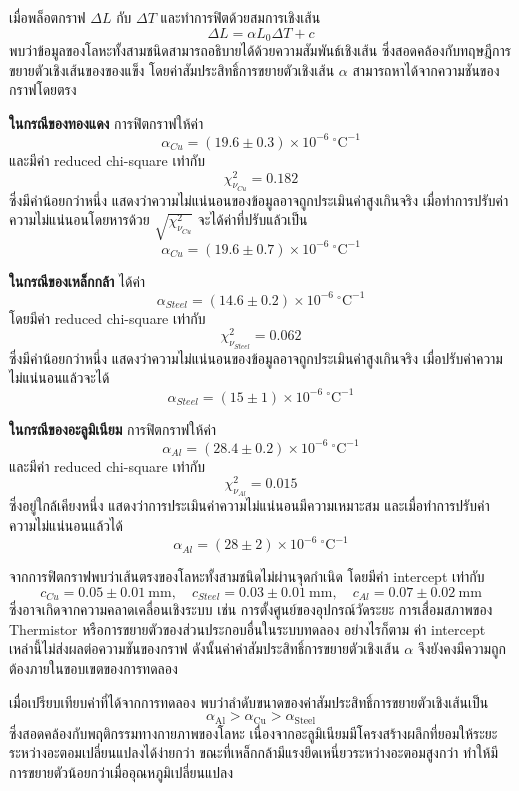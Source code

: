 \documentclass[11pt,a4paper]{article}
\begin{document}
เมื่อพล็อตกราฟ $\Delta L$ กับ $\Delta T$ และทำการฟิตด้วยสมการเชิงเส้น
\[
\Delta L = \alpha L_0 \Delta T + c
\]
พบว่าข้อมูลของโลหะทั้งสามชนิดสามารถอธิบายได้ด้วยความสัมพันธ์เชิงเส้น
ซึ่งสอดคล้องกับทฤษฎีการขยายตัวเชิงเส้นของของแข็ง
โดยค่าสัมประสิทธิ์การขยายตัวเชิงเส้น $\alpha$ สามารถหาได้จากความชันของกราฟโดยตรง
\newline
\medskip

\textbf{ในกรณีของทองแดง} การฟิตกราฟให้ค่า
\[
\alpha_{Cu} = (19.6 \pm 0.3)\times10^{-6}\ ^\circ\mathrm{C}^{-1}
\]
และมีค่า reduced chi-square เท่ากับ
\[
\chi_{\nu_{Cu}}^2 = 0.182
\]
ซึ่งมีค่าน้อยกว่าหนึ่ง แสดงว่าความไม่แน่นอนของข้อมูลอาจถูกประเมินค่าสูงเกินจริง
เมื่อทำการปรับค่าความไม่แน่นอนโดยหารด้วย $\sqrt{\chi_{\nu_{Cu}}^2}$
จะได้ค่าที่ปรับแล้วเป็น
\[
\alpha_{Cu} = (19.6 \pm 0.7)\times10^{-6}\ ^\circ\mathrm{C}^{-1}
\]

\newline
\medskip

\textbf{ในกรณีของเหล็กกล้า} ได้ค่า
\[
\alpha_{Steel} = (14.6 \pm 0.2)\times10^{-6}\ ^\circ\mathrm{C}^{-1}
\]
โดยมีค่า reduced chi-square เท่ากับ
\[
\chi_{\nu_{Steel}}^2 = 0.062
\]
ซึ่งมีค่าน้อยกว่าหนึ่ง แสดงว่าความไม่แน่นอนของข้อมูลอาจถูกประเมินค่าสูงเกินจริง
เมื่อปรับค่าความไม่แน่นอนแล้วจะได้
\[
\alpha_{Steel} = (15 \pm 1)\times10^{-6}\ ^\circ\mathrm{C}^{-1}
\]

\newline
\medskip

\textbf{ในกรณีของอะลูมิเนียม} การฟิตกราฟให้ค่า
\[
\alpha_{Al} = (28.4 \pm 0.2)\times10^{-6}\ ^\circ\mathrm{C}^{-1}
\]
และมีค่า reduced chi-square เท่ากับ
\[
\chi_{\nu_{Al}}^2 = 0.015
\]
ซึ่งอยู่ใกล้เคียงหนึ่ง แสดงว่าการประเมินค่าความไม่แน่นอนมีความเหมาะสม
และเมื่อทำการปรับค่าความไม่แน่นอนแล้วได้
\[
\alpha_{Al} = (28 \pm 2)\times10^{-6}\ ^\circ\mathrm{C}^{-1}
\]

จากการฟิตกราฟพบว่าเส้นตรงของโลหะทั้งสามชนิดไม่ผ่านจุดกำเนิด
โดยมีค่า intercept เท่ากับ
\[
c_{Cu} = 0.05 \pm 0.01\ \mathrm{mm}, \quad
c_{Steel} = 0.03 \pm 0.01\ \mathrm{mm}, \quad
c_{Al} = 0.07 \pm 0.02\ \mathrm{mm}
\]
ซึ่งอาจเกิดจากความคลาดเคลื่อนเชิงระบบ
เช่น การตั้งศูนย์ของอุปกรณ์วัดระยะ การเสื่อมสภาพของ Thermistor
หรือการขยายตัวของส่วนประกอบอื่นในระบบทดลอง
อย่างไรก็ตาม ค่า intercept เหล่านี้ไม่ส่งผลต่อความชันของกราฟ
ดังนั้นค่าค่าสัมประสิทธิ์การขยายตัวเชิงเส้น $\alpha$
จึงยังคงมีความถูกต้องภายในขอบเขตของการทดลอง

เมื่อเปรียบเทียบค่าที่ได้จากการทดลอง
พบว่าลำดับขนาดของค่าสัมประสิทธิ์การขยายตัวเชิงเส้นเป็น
\[
\alpha_{\text{Al}} > \alpha_{\text{Cu}} > \alpha_{\text{Steel}}
\]
ซึ่งสอดคล้องกับพฤติกรรมทางกายภาพของโลหะ
เนื่องจากอะลูมิเนียมมีโครงสร้างผลึกที่ยอมให้ระยะระหว่างอะตอมเปลี่ยนแปลงได้ง่ายกว่า
ขณะที่เหล็กกล้ามีแรงยึดเหนี่ยวระหว่างอะตอมสูงกว่า
ทำให้มีการขยายตัวน้อยกว่าเมื่ออุณหภูมิเปลี่ยนแปลง
\end{document}
